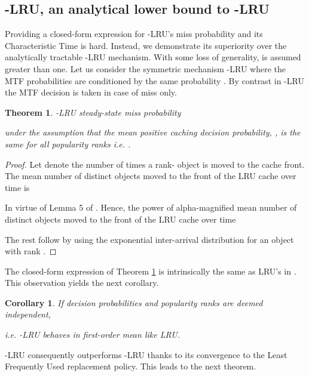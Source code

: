 \documentclass[conference]{IEEEtran}
\newtheorem{theorem}{Theorem}
\newtheorem{corollary}{Corollary}[theorem]
\begin{document}
\subsection{-LRU, an analytical lower bound to -LRU}
\label{subsec:lower_bound}
Providing a closed-form expression for -LRU's 
miss probability and its Characteristic Time  
is hard. Instead, we demonstrate its superiority over the 
analytically tractable -LRU mechanism.
With some loss of generality,  is assumed greater 
than one. Let us consider the symmetric mechanism 
-LRU where the MTF probabilities are conditioned  
by the same probability . By contrast in 
-LRU the MTF decision is taken in case of miss 
only.
\begin{theorem} \label{theo:pi_sym_LRU}
-LRU steady-state miss probability

under the assumption that the mean positive caching decision 
probability, , is the same for all popularity 
ranks i.e. .
\end{theorem}

\begin{proof} 
Let  denote the number of times a rank- object 
is moved to the cache front. The mean number of distinct objects moved 
to the front of the LRU cache over time is

In virtue of Lemma 5 of \cite{Jelenkovic:2004:OLC:1024662.1024670}.
Hence, the power of alpha-magnified mean number of distinct objects moved to the front of the LRU cache over time 

The rest follow by using the exponential inter-arrival distribution
for an object with rank .
\end{proof}
The closed-form expression of Theorem \ref{theo:pi_sym_LRU} is intrinsically the same as LRU's in \cite{Carofiglio:2013:PBS:2542828.2542992}. This observation yields the next corollary.

\begin{corollary}
If decision probabilities and popularity ranks are deemed independent,

i.e. -LRU behaves in first-order mean like LRU.
\end{corollary}
-LRU consequently outperforms -LRU thanks to its convergence to the Least Frequently Used replacement policy\cite{DBLP:journals/corr/MartinaGL13}. This leads to the next theorem.
\end{document}
